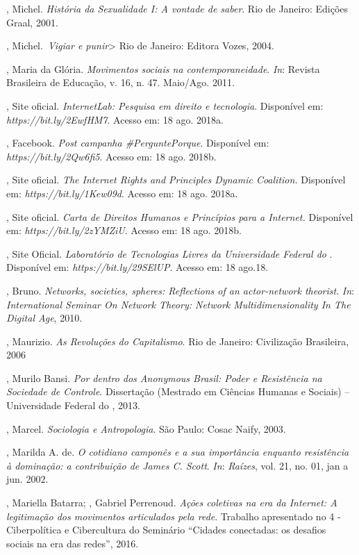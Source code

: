 , Michel. \emph{História da Sexualidade I: A vontade de
saber}. Rio de Janeiro: Edições Graal, 2001.

, Michel.~\emph{Vigiar e punir}> Rio de Janeiro: Editora Vozes, 2004.

, Maria da Glória. \emph{Movimentos sociais na contemporaneidade}.
\emph{In}: Revista Brasileira de Educação, v. 16, n. 47. Maio/Ago. 2011.

, Site oficial. \emph{InternetLab: Pesquisa em direito e
tecnologia}. Disponível em: \emph{https://bit.ly/2EwfHM7}. Acesso em: 18 ago. 2018a.

, Facebook. \emph{Post campanha \#PerguntePorque}.
Disponível em: \emph{https://bit.ly/2Qw6fi5}. Acesso em: 18 ago. 2018b.

, Site oficial. \emph{The Internet Rights and Principles Dynamic
Coalition.} Disponível em: \emph{https://bit.ly/1Kew09d}. Acesso em: 18 ago. 2018a.

, Site oficial. \emph{Carta de Direitos Humanos e Princípios para
a Internet.} Disponível em: \emph{https://bit.ly/2zYMZiU}. Acesso em: 18 ago. 2018b.

, Site Oficial. \emph{Laboratório de Tecnologias Livres da
Universidade Federal do }. Disponível em: \emph{https://bit.ly/29SElUP}. Acesso em: 18 ago.18.

, Bruno. \emph{Networks, societies, spheres: Reflections of an
actor-network theorist}. \emph{In}: \emph{International Seminar On Network Theory:
Network Multidimensionality In The Digital Age}, 2010.

, Maurizio. \emph{As Revoluções do Capitalismo}. Rio de
Janeiro: Civilização Brasileira, 2006

, Murilo Bansi. \emph{Por dentro dos Anonymous Brasil: Poder e
Resistência na Sociedade de Controle}. Dissertação (Mestrado em Ciências
Humanas e Sociais) -- Universidade Federal do , 2013.

, Marcel. \emph{Sociologia e Antropologia}. São Paulo: Cosac
Naify, 2003.

, Marilda A. de. \emph{O cotidiano camponês e a sua importância enquanto
resistência à dominação: a contribuição de James C. Scott}. \emph{In}:
\emph{Raízes}, vol. 21, no. 01, jan a jun. 2002.

, Mariella Batarra; , Gabriel Perrenoud. \emph{Ações
coletivas na era da Internet: A legitimação dos movimentos articulados
pela rede}. Trabalho apresentado no  4 - Ciberpolítica e Cibercultura
do Seminário  ``Cidades conectadas: os desafios sociais na era das
redes'', 2016.

